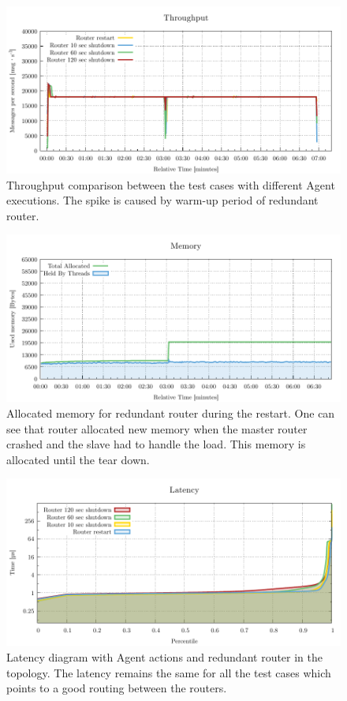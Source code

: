 \begin{figure}[H]
	\centering
	\includegraphics[width=1\linewidth]{obrazky-figures/charts/agent-redundant-throughput.pdf}
	\caption{Throughput comparison between the test cases with different Agent executions. The spike is caused by warm-up period of redundant router.}
	\label{fig:agent-redundant-throughput}
\end{figure}

\begin{figure}[H]
	\centering
	\includegraphics[width=1\linewidth]{obrazky-figures/charts/restart-redundant-agent-memory.pdf}
	\caption{Allocated memory for redundant router during the restart. One can see that router allocated new memory when the master router crashed and the slave had to handle the load. This memory is allocated until the tear down.}
	\label{fig:agent-redundant-memory}
\end{figure}

\begin{figure}[H]
	\centering
	\includegraphics[width=1\linewidth]{obrazky-figures/charts/agent-redundant-latency.pdf}
	\caption{Latency diagram with Agent actions and redundant router in the topology. The latency remains the same for all the test cases which points to a good routing between the routers.}
	\label{fig:agent-redundant-latency}
\end{figure}

